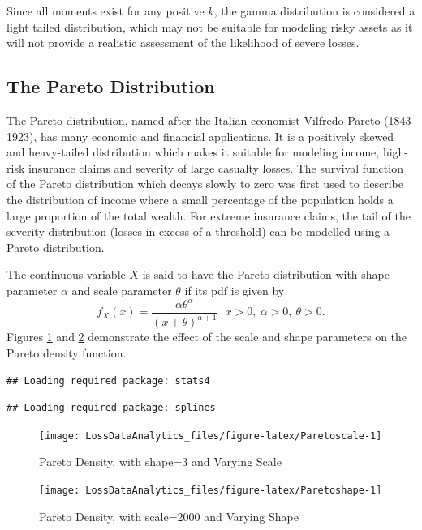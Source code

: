 \documentclass[]{book}
\theoremstyle{definition}
\theoremstyle{definition}
\theoremstyle{definition}
\theoremstyle{remark}
\begin{document}
Since all moments exist for any positive \(k\), the gamma distribution
is considered a light tailed distribution, which may not be suitable for
modeling risky assets as it will not provide a realistic assessment of
the likelihood of severe losses.

\subsection{The Pareto Distribution}\label{the-pareto-distribution}

The Pareto distribution, named after the Italian economist Vilfredo
Pareto (1843-1923), has many economic and financial applications. It is
a positively skewed and heavy-tailed distribution which makes it
suitable for modeling income, high-risk insurance claims and severity of
large casualty losses. The survival function of the Pareto distribution
which decays slowly to zero was first used to describe the distribution
of income where a small percentage of the population holds a large
proportion of the total wealth. For extreme insurance claims, the tail
of the severity distribution (losses in excess of a threshold) can be
modelled using a Pareto distribution.

The continuous variable \(X\) is said to have the Pareto distribution
with shape parameter \(\alpha\) and scale parameter \(\theta\) if its
pdf is given by
\[f_{X}\left( x \right) = \frac{\alpha\theta^{\alpha}}{\left( x + \theta \right)^{\alpha + 1}} \ \ \  x  >  0,\ \alpha >  0,\ \theta > 0.\]
Figures \ref{fig:Paretoscale} and \ref{fig:Paretoshape} demonstrate the
effect of the scale and shape parameters on the Pareto density function.

\begin{verbatim}
## Loading required package: stats4
\end{verbatim}

\begin{verbatim}
## Loading required package: splines
\end{verbatim}

\begin{figure}

{\centering \texttt{[image: LossDataAnalytics\_files/figure-latex/Paretoscale-1]} 

}

\caption{Pareto Density, with shape=3 and Varying Scale}\label{fig:Paretoscale}
\end{figure}

\begin{figure}

{\centering \texttt{[image: LossDataAnalytics\_files/figure-latex/Paretoshape-1]} 

}

\caption{Pareto Density, with scale=2000 and Varying Shape}\label{fig:Paretoshape}
\end{figure}
\end{document}
